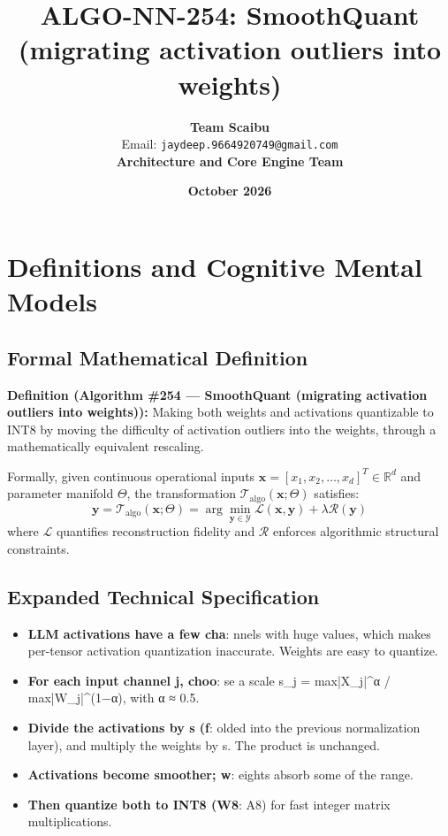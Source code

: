 \documentclass[11pt,a4paper]{article}
\title{\textbf{ALGO-NN-254: SmoothQuant (migrating activation outliers into weights)}}
\author{\textbf{Team Scaibu} \\ \small Email: \texttt{jaydeep.9664920749@gmail.com} \\ \small \textbf{Architecture and Core Engine Team}}
\date{\textbf{October 2026}}
\theoremstyle{definition}
\begin{document}
\maketitle

\section{Definitions and Cognitive Mental Models}

\subsection{Formal Mathematical Definition}
\textbf{Definition (Algorithm \#254 --- SmoothQuant (migrating activation outliers into weights)):}
Making both weights and activations quantizable to INT8 by moving the difficulty of activation outliers into the weights, through a mathematically equivalent rescaling.

Formally, given continuous operational inputs $\mathbf{x} = [x_1, x_2, \dots, x_d]^T \in \mathbb{R}^d$ and parameter manifold $\Theta$, the transformation $\mathcal{T}_{\text{algo}}(\mathbf{x}; \Theta)$ satisfies:
{\boldmath
\begin{equation}
\mathbf{y} = \mathcal{T}_{\text{algo}}(\mathbf{x}; \Theta) = \arg\min_{\mathbf{y} \in \mathcal{Y}} \mathcal{L}(\mathbf{x}, \mathbf{y}) + \lambda \mathcal{R}(\mathbf{y})
\end{equation}
}
where $\mathcal{L}$ quantifies reconstruction fidelity and $\mathcal{R}$ enforces algorithmic structural constraints.

\subsection{Expanded Technical Specification}
\begin{itemize}
\item \textbf{LLM activations have a few cha}: nnels with huge values, which makes per-tensor activation quantization inaccurate. Weights are easy to quantize.
\item \textbf{For each input channel j, choo}: se a scale s\_j = max|X\_j|^α / max|W\_j|^(1−α), with α ≈ 0.5.
\item \textbf{Divide the activations by s (f}: olded into the previous normalization layer), and multiply the weights by s. The product is unchanged.
\item \textbf{Activations become smoother; w}: eights absorb some of the range.
\item \textbf{Then quantize both to INT8 (W8}: A8) for fast integer matrix multiplications.
\end{itemize}
\end{document}
